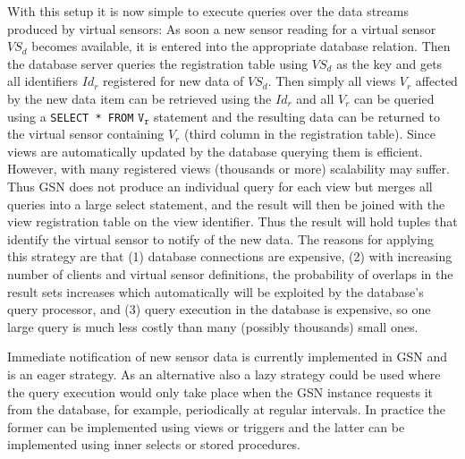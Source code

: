 With this setup it is now simple to execute queries over the data streams
produced by virtual sensors: As soon a new sensor reading for a virtual sensor
$VS_d$ becomes available, it is entered into the appropriate database relation.
Then the database server queries the registration table using $VS_d$ as the key
and gets all identifiers $Id_r$ registered for new data of $VS_d$. Then simply
all views $V_r$ affected by the new data item can be retrieved using the $Id_r$
and all $V_r$ can be queried using a \texttt{SELECT * FROM} $\mathtt{V_r}$
statement and the resulting data can be returned to the virtual sensor
containing $V_r$ (third column in the registration table). Since views are
automatically updated by the database querying them is efficient. However, with
many registered views (thousands or more) scalability may suffer. Thus GSN does
not produce an individual query for each view but merges all queries into a
large select statement, and the result will then be joined with the view
registration table on the view identifier. Thus the result will hold tuples
that identify the virtual sensor to notify of the new data.  The reasons for
applying this strategy are that (1) database connections are expensive, (2)
with increasing number of clients and virtual sensor definitions, the
probability of overlaps in the result sets increases which automatically will
be exploited by the database's query processor, and (3) query execution in the
database is expensive, so one large query is much less costly than many
(possibly thousands) small ones.

Immediate notification of new sensor data is currently implemented in GSN and
is an eager strategy. As an alternative also a lazy strategy could be used
where the query execution would only take place when the GSN instance requests
it from the database, for example, periodically at regular intervals. In
practice the former can be implemented using views or triggers and the latter
can be implemented using inner selects or stored procedures.




